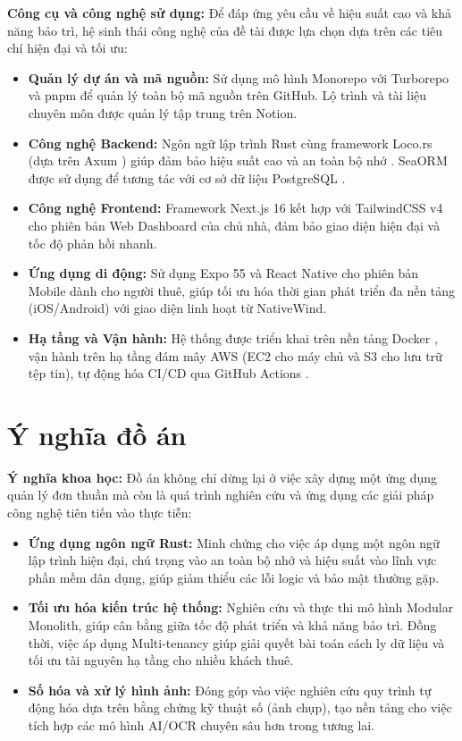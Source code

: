 \textbf{Công cụ và công nghệ sử dụng:}
Để đáp ứng yêu cầu về hiệu suất cao và khả năng bảo trì, hệ sinh thái công nghệ của đề tài được lựa chọn dựa trên các tiêu chí hiện đại và tối ưu:
\begin{itemize}
    \item \textbf{Quản lý dự án và mã nguồn:} Sử dụng mô hình Monorepo với Turborepo và pnpm để quản lý toàn bộ mã nguồn trên GitHub. Lộ trình và tài liệu chuyên môn được quản lý tập trung trên Notion.
    \item \textbf{Công nghệ Backend:} Ngôn ngữ lập trình Rust cùng framework Loco.rs (dựa trên Axum \cite{Axum}) giúp đảm bảo hiệu suất cao và an toàn bộ nhớ \cite{RustBook}. SeaORM \cite{SeaORM} được sử dụng để tương tác với cơ sở dữ liệu PostgreSQL \cite{PostgreSQL}.
    \item \textbf{Công nghệ Frontend:} Framework Next.js 16 kết hợp với TailwindCSS v4 cho phiên bản Web Dashboard của chủ nhà, đảm bảo giao diện hiện đại và tốc độ phản hồi nhanh.
    \item \textbf{Ứng dụng di động:} Sử dụng Expo 55 và React Native cho phiên bản Mobile dành cho người thuê, giúp tối ưu hóa thời gian phát triển đa nền tảng (iOS/Android) với giao diện linh hoạt từ NativeWind.
    \item \textbf{Hạ tầng và Vận hành:} Hệ thống được triển khai trên nền tảng Docker \cite{Docker}, vận hành trên hạ tầng đám mây AWS \cite{AWS} (EC2 cho máy chủ và S3 cho lưu trữ tệp tin), tự động hóa CI/CD qua GitHub Actions \cite{GitHubActions}.
\end{itemize}

\section{Ý nghĩa đồ án}

\textbf{Ý nghĩa khoa học:}
Đồ án không chỉ dừng lại ở việc xây dựng một ứng dụng quản lý đơn thuần mà còn là quá trình nghiên cứu và ứng dụng các giải pháp công nghệ tiên tiến vào thực tiễn:
\begin{itemize}
    \item \textbf{Ứng dụng ngôn ngữ Rust:} Minh chứng cho việc áp dụng một ngôn ngữ lập trình hiện đại, chú trọng vào an toàn bộ nhớ và hiệu suất vào lĩnh vực phần mềm dân dụng, giúp giảm thiểu các lỗi logic và bảo mật thường gặp.
    \item \textbf{Tối ưu hóa kiến trúc hệ thống:} Nghiên cứu và thực thi mô hình Modular Monolith, giúp cân bằng giữa tốc độ phát triển và khả năng bảo trì. Đồng thời, việc áp dụng Multi-tenancy giúp giải quyết bài toán cách ly dữ liệu và tối ưu tài nguyên hạ tầng cho nhiều khách thuê.
    \item \textbf{Số hóa và xử lý hình ảnh:} Đóng góp vào việc nghiên cứu quy trình tự động hóa dựa trên bằng chứng kỹ thuật số (ảnh chụp), tạo nền tảng cho việc tích hợp các mô hình AI/OCR chuyên sâu hơn trong tương lai.
\end{itemize}

